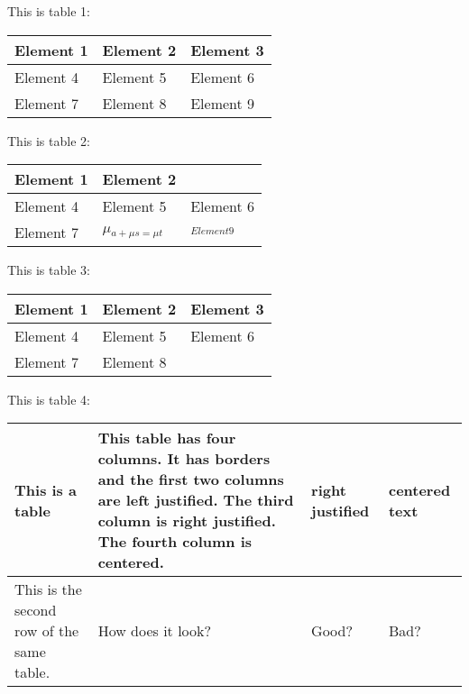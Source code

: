 \documentclass{article}
\begin{document}
This is table 1:\\


\begin{longtable}{|p{1.000in}|p{1.200in}|p{1.875in}|}
\hline
{\raggedright Element 1} & 
{\raggedright Element 2} & 
{\raggedright Element 3} \\
\hline
{\raggedright Element 4} & 
{\raggedright Element 5} & 
{\raggedright Element 6} \\
\hline
{\raggedright Element 7} & 
{\raggedright Element 8} & 
{\raggedright Element 9} \\
\hline
\end{longtable}

This is table 2:\\


\begin{longtable}{|p{1.387in}|p{1.625in}|p{0.875in}|}
\hline
{\raggedright Element 1} & 
{\raggedright Element 2} & 
{\raggedright } \\
\hline
{\raggedright Element 4} & 
{\raggedright Element 5} & 
{\raggedright Element 6} \\
\hline
{\raggedright Element 7} & 
{\raggedright \ensuremath{\mu}$_{a + \ensuremath{\mu}s = \ensuremath{\mu}t}$} & 
{\raggedright $_{Element 9}$} \\
\hline
\end{longtable}

This is table 3:\\


\begin{longtable}{|p{1.500in}|p{1.500in}|p{1.500in}|}
\hline
{\raggedright Element 1} & 
{\raggedright Element 2} & 
{\raggedright Element 3} \\
\hline
{\raggedright Element 4} & 
{\raggedright Element 5} & 
{\raggedright Element 6} \\
\hline
{\raggedright Element 7} & 
{\raggedright Element 8} & 
{\raggedright } \\
\hline
\end{longtable}

This is table 4:\\


\begin{longtable}{|p{1.393in}|p{1.393in}|p{0.929in}|p{0.784in}|}
\hline
{\raggedright This is a table} & 
{\raggedright This table has four columns. It has borders and the first two 
columns are left justified. The third column is right justified. 
The fourth column is centered.} & 
{\raggedright right justified} & 
{\raggedright centered text} \\
\hline
{\raggedright This is the second row of the same table.} & 
{\raggedright How does it look?} & 
{\raggedright Good?} & 
{\raggedright Bad?} \\
\hline
\end{longtable}
\end{document}
